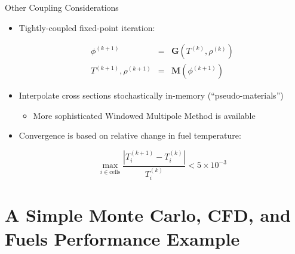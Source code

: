 \documentclass[10pt]{beamer}
\begin{document}
\begin{frame}{Other Coupling Considerations}

\begin{itemize}
\item Tightly-coupled fixed-point iteration:

\begin{subequations}
\begin{eqnarray}
\phi^{(k+1)}&=&\textbf{G}\left(T^{(k)},\rho^{(k)}\right)\\
T^{(k+1)}, \rho^{(k+1)}&=&\textbf{M}\left(\phi^{(k+1)}\right)
\end{eqnarray}
\end{subequations}
	\vspace{0.05cm}
\item Interpolate cross sections stochastically in-memory (``pseudo-materials'')
	\begin{itemize}
	\item More sophisticated Windowed Multipole Method is available
	\end{itemize}
	\vspace{0.5cm}
\item Convergence is based on relative change in fuel temperature:

\begin{equation}
\max_{i\in \text{cells}}\frac{|T_{i}^{(k+1)}-T_i^{(k)}|}{T_i^{(k)}}<5\times10^{-3}
\end{equation}
\end{itemize}
\end{frame}

\section{A Simple Monte Carlo, CFD, and Fuels Performance Example}
\end{document}
